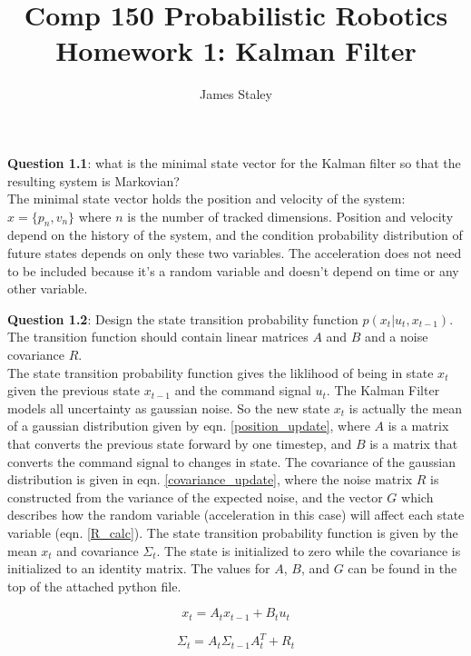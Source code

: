 \documentclass{article}
\title{Comp 150 Probabilistic Robotics Homework 1: Kalman Filter}
\author{James Staley}
\date{\vspace{-2em}}
\begin{document}
\maketitle
{\bf Question 1.1}: what is the minimal state vector for the Kalman filter so that the resulting system is Markovian?\\

The minimal state vector holds the position and velocity of the system: $x = \{p_n, v_n\}$ where $n$ is the number of tracked dimensions. Position and velocity depend on the history of the system, and the condition probability distribution of future states depends on only these two variables. The acceleration does not need to be included because it's a random variable and doesn't depend on time or any other variable. 

{\bf Question 1.2}: Design the state transition probability function $p(x_t | u_t, x_{t-1})$. The transition function should contain linear matrices $A$ and $B$ and a noise covariance $R$.\\

The state transition probability function gives the liklihood of being in state $x_t$ given the previous state $x_{t-1}$ and the command signal $u_t$. The Kalman Filter models all uncertainty as gaussian noise. So the new state $x_t$ is actually the mean of a gaussian distribution given by eqn. \ref{position_update}, where $A$ is a matrix that converts the previous state forward by one timestep, and $B$ is a matrix that converts the command signal to changes in state. The covariance of the gaussian distribution is given in eqn. \ref{covariance_update}, where the noise matrix $R$ is constructed from the variance of the expected noise, and the vector $G$ which describes how the random variable (acceleration in this case) will affect each state variable (eqn. \ref{R_calc}). The state transition probability function is given by the mean $x_t$ and covariance $\Sigma_t$. The state is initialized to zero while the covariance is initialized to an identity matrix. The values for $A$, $B$, and $G$ can be found in the top of the attached python file.

\begin{equation}\label{position_update}
    x_t = A_t x_{t-1} + B_t u_t
\end{equation}

\begin{equation}\label{covariance_update}
    \Sigma_t = A_t \Sigma_{t-1} A^T_t + R_t
\end{equation}
\end{document}
